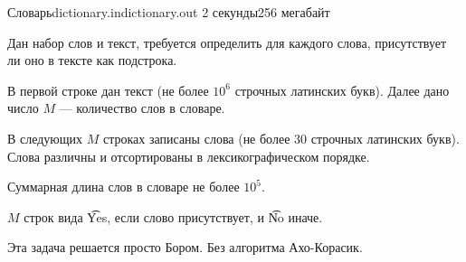 
\begin{problem}{Словарь}{dictionary.in}{dictionary.out}
{2 секунды}{256 мегабайт}

Дан набор слов и текст, требуется определить для каждого слова, присутствует ли оно в тексте как подстрока.

\InputFile

В первой строке дан текст (не более $10^6$ строчных латинских букв).
Далее дано число $M$ --- количество слов в словаре.

В следующих $M$ строках записаны слова (не более $30$ строчных латинских букв).
Слова различны и отсортированы в лексикографическом порядке.

Суммарная длина слов в словаре не более $10^5$.

\OutputFile

$M$ строк вида \t{Yes}, если слово присутствует, и \t{No} иначе.

\Example

\begin{example}
%
\end{example}

\Note

Эта задача решается просто Бором. Без алгоритма Ахо-Корасик.

\end{problem}
